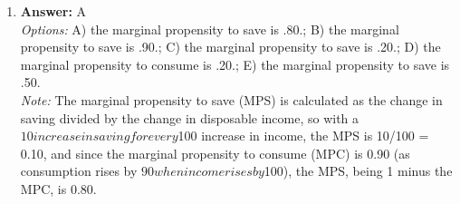 \documentclass[12pt]{article}
\begin{document}
\begin{enumerate}[label=\arabic*.]
\\ \textit{Note:} The technically efficient method of production refers to the optimal use of resources to minimize the time and inputs required to produce a given output, thus maximizing productivity.
\item \textbf{Answer:} A
\\ \textit{Options:} A) the marginal propensity to save is .80.; B) the marginal propensity to save is .90.; C) the marginal propensity to save is .20.; D) the marginal propensity to consume is .20.; E) the marginal propensity to save is .50.
\\ \textit{Note:} The marginal propensity to save (MPS) is calculated as the change in saving divided by the change in disposable income, so with a $10 increase in saving for every $100 increase in income, the MPS is 10/100 = 0.10, and since the marginal propensity to consume (MPC) is 0.90 (as consumption rises by $90 when income rises by $100), the MPS, being 1 minus the MPC, is 0.80.
\end{enumerate}
\end{document}
